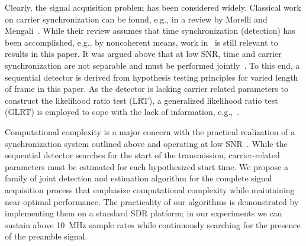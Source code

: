 Clearly, the signal acquisition problem has been considered widely. 
Classical work on carrier synchronization can be found, e.g., in a
review by  Morelli
and Mengali~\cite{Morelli_Mengali_98}. 
While their review assumes that time synchronization (detection) has been
accomplished, e.g., by noncoherent means, 
work in~\cite{kay_89,Fitz_94,Luise_Reggiannini_95}
is still relevant to results in this paper.
It was argued above that at low SNR, time and carrier synchronization
are not separable and must be performed jointly~\cite{purushothaman_16,kim_17}.
To this end, 
a sequential detector is derived from hypothesis testing principles
for varied length of frame in this paper.
As the detector is lacking carrier related parameters to construct 
the likelihood ratio test (LRT), a generalized likelihood ratio test (GLRT)
is employed to cope with the lack of information, e.g.,~\cite{liang_15}.

Computational complexity is a major concern with the practical
realization of a synchronization system outlined above and operating at low SNR~\cite{murin_16,wang_21}.
While the sequential detector searches for the start of the
transmission, carrier-related parameters must be estimated for each
hypothesized start time. 
We propose a family of joint detection and estimation algorithm 
for the complete signal acquisition process
that emphasize computational complexity while maintaining near-optimal performance.
The practicality of our algorithms is demonstrated by implementing
them on a standard SDR platform; in our experiments we can sustain
above \SI{10}{\mega\hertz} sample rates while continuously searching
for the presence of the preamble signal.
